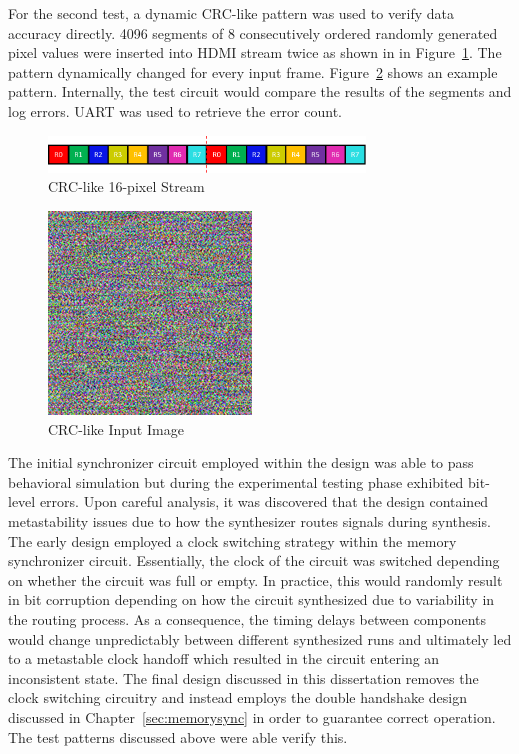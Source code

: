         For the second test, a dynamic CRC-like pattern was used to verify data accuracy directly. 4096 segments of 8 consecutively ordered randomly generated pixel values were inserted into HDMI stream twice as shown in in Figure~\ref{fig:crc_like_buffer}. The pattern dynamically changed for every input frame. Figure~\ref{fig:random_noise} shows an example pattern. Internally, the test circuit would compare the results of the segments and log errors. UART was used to retrieve the error count.

        \begin{figure}[t]
            \centering
            \includegraphics[width=0.75\textwidth]{fig/crc_like_buffer.pdf}
            \caption{CRC-like 16-pixel Stream}
            \label{fig:crc_like_buffer}
        \end{figure}

        \begin{figure}[t]
            \centering
            \includegraphics{fig/random_noise.png}
            \caption{CRC-like Input Image}
            \label{fig:random_noise}
        \end{figure}

        The initial synchronizer circuit employed within the design was able to pass behavioral simulation but during the experimental testing phase exhibited bit-level errors. Upon careful analysis, it was discovered that the design contained metastability issues due to how the synthesizer routes signals during synthesis. The early design employed a clock switching strategy within the memory synchronizer circuit. Essentially, the clock of the circuit was switched depending on whether the circuit was full or empty. In practice, this would randomly result in bit corruption depending on how the circuit synthesized due to variability in the routing process. As a consequence, the timing delays between components would change unpredictably between different synthesized runs and ultimately led to a metastable clock handoff which resulted in the circuit entering an inconsistent state. The final design discussed in this dissertation removes the clock switching circuitry and instead employs the double handshake design discussed in Chapter~\ref{sec:memorysync} in order to guarantee correct operation. The test patterns discussed above were able verify this.

